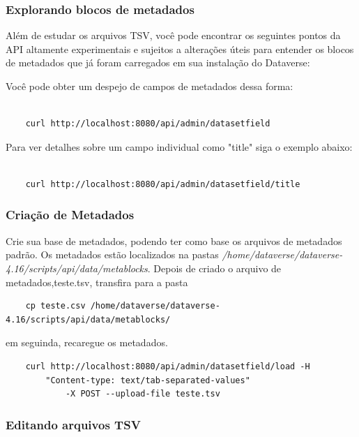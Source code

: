 \documentclass[12pt,hidelinks]{article}
\begin{document}
\subsubsection{Explorando blocos de metadados}

\qquad Além de estudar os arquivos TSV, você pode encontrar os seguintes pontos da API altamente experimentais e sujeitos a alterações úteis para entender os blocos de metadados que já foram carregados em sua instalação do Dataverse:

Você pode obter um despejo de campos de metadados dessa forma:

\begin{verbatim}

    curl http://localhost:8080/api/admin/datasetfield

\end{verbatim}

Para ver detalhes sobre um campo individual como "title" siga o exemplo abaixo:

\begin{verbatim}

    curl http://localhost:8080/api/admin/datasetfield/title

\end{verbatim}

\subsubsection{Criação de Metadados}
        
        \qquad Crie sua base de metadados, podendo ter como base os arquivos de metadados padrão. Os metadados estão localizados na pastas \textit{/home/dataverse/dataverse-4.16/scripts/api/data/metablocks}. Depois de criado o arquivo de metadados,teste.tsv, transfira para a pasta
        
        \begin{verbatim}
    cp teste.csv /home/dataverse/dataverse-4.16/scripts/api/data/metablocks/
        \end{verbatim}
        em seguinda, recaregue os metadados.
        \begin{verbatim}
    curl http://localhost:8080/api/admin/datasetfield/load -H 
        "Content-type: text/tab-separated-values" 
            -X POST --upload-file teste.tsv
        \end{verbatim}

\subsubsection{Editando arquivos TSV}
\end{document}
